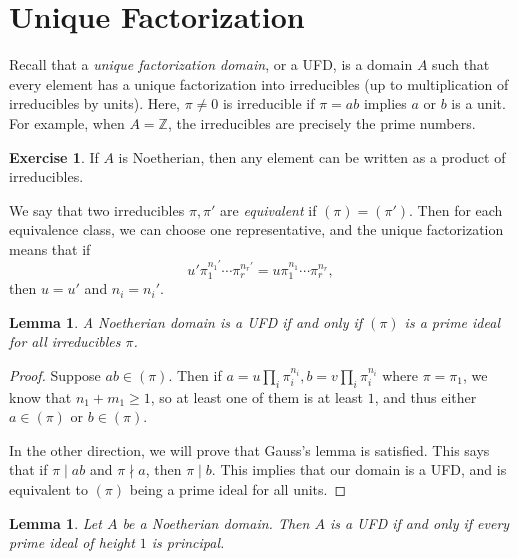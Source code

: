 \documentclass[leqno, openany]{memoir}
\newtheorem{lem}[thm]{Lemma}
\theoremstyle{definition}
\newtheorem{exer}[thm]{Exercise}
\theoremstyle{remark}
\theoremstyle{plain}
\theoremstyle{definition}
\theoremstyle{remark}
\newcommand{\Z}{\mathbb{Z}}
\begin{document}
\section{Unique Factorization}%
\label{sec:unique_factorization}

Recall that a \textit{unique factorization domain}, or a UFD, is a domain $A$ such that every element has a unique factorization into irreducibles (up to multiplication of irreducibles by units). Here, $\pi \neq 0$ is irreducible if $\pi = ab$ implies $a$ or $b$ is a unit. For example, when $A = \Z$, the irreducibles are precisely the prime numbers.

\begin{exer}
    If $A$ is Noetherian, then any element can be written as a product of irreducibles.
\end{exer}

We say that two irreducibles $\pi, \pi'$ are \textit{equivalent} if $(\pi) = (\pi')$. Then for each equivalence class, we can choose one representative, and the unique factorization means that if 
\[ u' \pi_1^{n_1'} \cdots \pi_r^{n_r'} = u \pi_1^{n_1} \cdots \pi_r^{n_r}, \]
then $u = u'$ and $n_i = n_i'$.

\begin{lem}
    A Noetherian domain is a UFD if and only if $(\pi)$ is a prime ideal for all irreducibles $\pi$.
\end{lem}

\begin{proof}
    Suppose $ab \in (\pi)$. Then if $a = u \prod_i \pi_i^{n_i}, b = v \prod_i \pi_i^{n_i}$ where $\pi = \pi_1$, we know that $n_1 + m_1 \geq 1$, so at least one of them is at least $1$, and thus either $a \in (\pi)$ or $b \in (\pi)$.

    In the other direction, we will prove that Gauss's lemma is satisfied. This says that if $\pi \mid ab$ and $\pi \nmid a$, then $\pi \mid b$. This implies that our domain is a UFD, and is equivalent to $(\pi)$ being a prime ideal for all units.
\end{proof}

\begin{lem}
    Let $A$ be a Noetherian domain. Then $A$ is a UFD if and only if every prime ideal of height $1$ is principal.
\end{lem}
\end{document}
